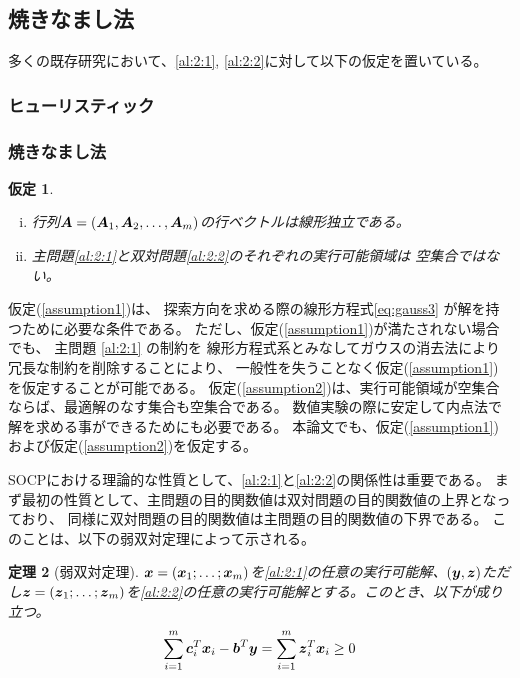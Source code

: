 \documentclass[11pt,a4paper,dvipdfmx,titlepage,uplatex]{jsarticle}
\theoremstyle{mystyle}
\newcommand{\0}{\mathbf{0}}
\newtheorem{theorem}{定理}
\newtheorem{assumption}[theorem]{仮定}
\def\b{\mbox{\boldmath $b$}}
\def\c{\mbox{\boldmath $c$}}
\def\x{\mbox{\boldmath $x$}}
\def\y{\mbox{\boldmath $y$}}
\def\z{\mbox{\boldmath $z$}}
\def\A{\mbox{\boldmath $A$}}
\begin{document}
\subsection{焼きなまし法}\label{sec:Second_Order_Cone_Programming:property}
多くの既存研究において、\eqref{al:2:1}, \eqref{al:2:2}に対して以下の仮定を置いている。
\subsubsection{ヒューリスティック}
\subsubsection{焼きなまし法}
\begin{assumption}\label{assumption:SOCP}

\begin{enumerate}[(i)] \upshape
	\item 行列$\A = (\A_1 , \A_2 , \dots , \A_m)$の行ベクトルは線形独立である。\label{assumption1}
	\item 主問題\eqref{al:2:1}と双対問題\eqref{al:2:2}のそれぞれの実行可能領域は
	空集合ではない。\label{assumption2}
\end{enumerate}

\end{assumption}

仮定(\ref{assumption1})は、
探索方向を求める際の線形方程式\eqref{eq:gauss3}
が解を持つために必要な条件である。
ただし、仮定(\ref{assumption1})が満たされない場合でも、
主問題 \eqref{al:2:1} の制約を
線形方程式系とみなしてガウスの消去法により冗長な制約を削除することにより、
一般性を失うことなく仮定(\ref{assumption1})を仮定することが可能である。
仮定(\ref{assumption2})は、実行可能領域が空集合ならば、最適解のなす集合も空集合である。
数値実験の際に安定して内点法で解を求める事ができるためにも必要である。
本論文でも、仮定(\ref{assumption1})および仮定(\ref{assumption2})を仮定する。

SOCPにおける理論的な性質として、\eqref{al:2:1}と\eqref{al:2:2}の関係性は重要である。
まず最初の性質として、主問題の目的関数値は双対問題の目的関数値の上界となっており、
同様に双対問題の目的関数値は主問題の目的関数値の下界である。
このことは、以下の弱双対定理によって示される。

\begin{theorem}[弱双対定理]\label{theorem:weak-duality}
$\x = (\x_1; \dots ; \x_m)$を\eqref{al:2:1}の任意の実行可能解、$(\y,\z)$ただし$\z = (\z_1; \dots ; \z_m)$を\eqref{al:2:2}の任意の実行可能解とする。このとき、以下が成り立つ。
  \begin{align}
    \sum_{i=1}^m \c_i^T \x_i - \b^T \y = \sum_{i=1}^m \z_i^T \x_i \ge 0
  \end{align}
\end{theorem}
\end{document}
